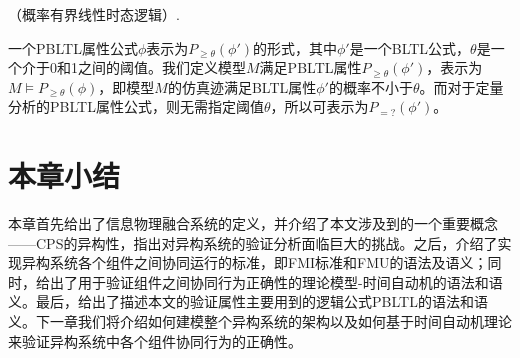 \begin{define}\label{def:pbltl}
（概率有界线性时态逻辑）.

一个PBLTL属性公式$\phi$表示为$P_{\geq \theta}(\phi')$的形式，其中$\phi'$是一个BLTL公式，$\theta$是一个介于0和1之间的阈值。我们定义模型$M$满足PBLTL属性$P_{\geq \theta}(\phi')$，表示为$M \models P_{\geq \theta}(\phi)$，即模型$M$的仿真迹满足BLTL属性$\phi'$的概率不小于$\theta$。而对于定量分析的PBLTL属性公式，则无需指定阈值$\theta$，所以可表示为$P_{=?}(\phi')$。
\end{define}


\section{本章小结}
本章首先给出了信息物理融合系统的定义，并介绍了本文涉及到的一个重要概念——CPS的异构性，指出对异构系统的验证分析面临巨大的挑战。之后，介绍了实现异构系统各个组件之间协同运行的标准，即FMI标准和FMU的语法及语义；同时，给出了用于验证组件之间协同行为正确性的理论模型-时间自动机的语法和语义。最后，给出了描述本文的验证属性主要用到的逻辑公式PBLTL的语法和语义。下一章我们将介绍如何建模整个异构系统的架构以及如何基于时间自动机理论来验证异构系统中各个组件协同行为的正确性。
